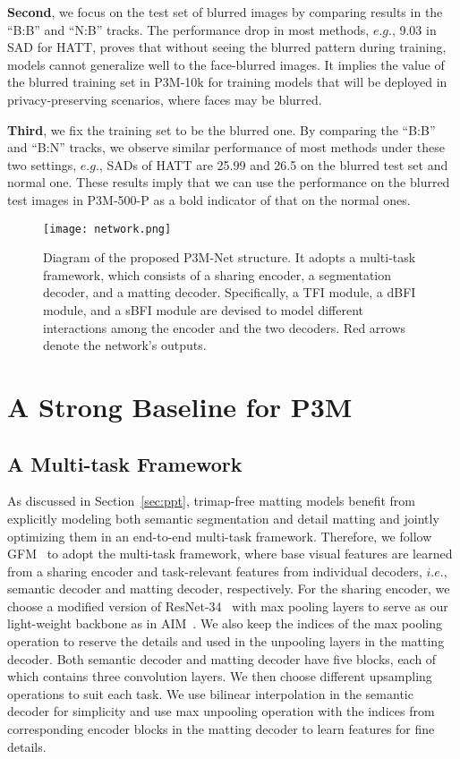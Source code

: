 \documentclass[sigconf]{acmart}
\begin{document}
\textbf{Second}, we focus on the test set of blurred images by comparing results in the ``B:B'' and ``N:B'' tracks. The performance drop in most methods, $e.g.$, 9.03 in SAD for HATT, proves that without seeing the blurred pattern during training, models cannot generalize well to the face-blurred images. It implies the value of the blurred training set in P3M-10k for training models that will be deployed in privacy-preserving scenarios, where faces may be blurred.

\textbf{Third}, we fix the training set to be the blurred one. By comparing the ``B:B'' and ``B:N'' tracks, we observe similar performance of most methods under these two settings, $e.g.$, SADs of HATT are 25.99 and 26.5 on the blurred test set and normal one.
These results imply that we can use the performance on the blurred test images in P3M-500-P as a bold indicator of that on the normal ones.

\label{sec:ppt}



\begin{figure*}[t]
    \centering
    \texttt{[image: network.png]}
    \caption{Diagram of the proposed P3M-Net structure. It adopts a multi-task framework, which consists of a sharing encoder, a segmentation decoder, and a matting decoder. Specifically, a TFI module, a dBFI module, and a sBFI module are devised to model different interactions among the encoder and the two decoders. Red arrows denote the network's outputs.}
    \label{fig:network}
\end{figure*}
\section{A Strong Baseline for P3M}



\subsection{A Multi-task Framework}
As discussed in Section~\ref{sec:ppt}, trimap-free matting models benefit from explicitly modeling both semantic segmentation and detail matting and jointly optimizing them in an end-to-end multi-task framework. Therefore, we follow GFM~\cite{gfm} to adopt the multi-task framework, where base visual features are learned from a sharing encoder and task-relevant features from individual decoders, $i.e.$, semantic decoder and matting decoder, respectively. For the sharing encoder, we choose a modified version of ResNet-34~\cite{he2016deep} with max pooling layers to serve as our light-weight backbone as in AIM~\cite{aim}. We also keep the indices of the max pooling operation to reserve the details and used in the unpooling layers in the matting decoder. Both semantic decoder and matting decoder have five blocks, each of which contains three convolution layers. We then choose different upsampling operations to suit each task. We use bilinear interpolation in the semantic decoder for simplicity and use max unpooling operation with the indices from corresponding encoder blocks in the matting decoder to learn features for fine details.
\end{document}
